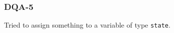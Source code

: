 \subsubsection{DQA-5}\label{sec:error_code_dqa_5}

Tried to assign something to a variable of type \texttt{state}.


